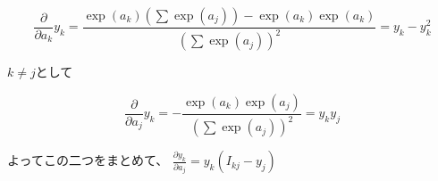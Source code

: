 \begin{equation}
	\frac{\partial}{\partial a_k} y_k = \frac{\exp(a_k) (\sum \exp(a_j)) - \exp (a_k) \exp(a_k) }{(\sum \exp(a_j))^2} = y_k - y_k^2
\end{equation}

$k \neq j$として

\begin{equation}
	\frac{\partial}{\partial a_j} y_k = -\frac{\exp(a_k) \exp(a_j) }{(\sum \exp(a_j))^2} =  y_k y_j
\end{equation}

よってこの二つをまとめて、
$\frac{\partial y_k}{\partial a_j} = y_k (I_{kj} - y_j)$









